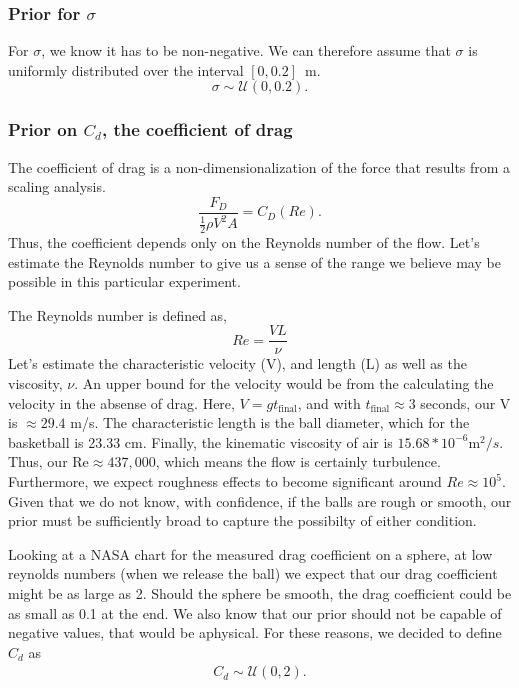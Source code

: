 \documentclass{article}
\begin{document}
\subsubsection*{Prior for $\sigma$}

For $\sigma$, we know it has to be non-negative. We can therefore
assume that $\sigma$ is uniformly distributed over the interval $[0,0.2]$~m.
\[
\sigma\sim\mathcal{U}(0,0.2).
\]



\subsubsection*{Prior on $C_{d}$, the coefficient of drag}

The coefficient of drag is a non-dimensionalization of the force that
results from a scaling analysis.
\[
\frac{F_{D}}{\frac{1}{2}\rho V^{2}A}=C_{D}(Re).
\]
 Thus, the coefficient depends only on the Reynolds number of the
flow. Let's estimate the Reynolds number to give us a sense of the
range we believe may be possible in this particular experiment.

The Reynolds number is defined as,
\[
Re=\frac{VL}{\nu}
\]
 Let's estimate the characteristic velocity (V), and length (L) as
well as the viscosity, $\nu$. An upper bound for the velocity would
be from the calculating the velocity in the absense of drag. Here,
$V=gt_{\text{final}}$, and with $t_{\text{final}}\approx3$ seconds,
our V is $\approx29.4$ m/s. The characteristic length is the ball
diameter, which for the basketball is 23.33 cm. Finally, the kinematic
viscosity of air is $15.68*10^{-6}\text{m}^{2}/s$. Thus, our $\text{Re}\approx437,000$,
which means the flow is certainly turbulence. Furthermore, we expect
roughness effects to become significant around $Re\approx10^{5}$.
Given that we do not know, with confidence, if the balls are rough
or smooth, our prior must be sufficiently broad to capture the possibilty
of either condition.

Looking at a NASA chart for the measured drag coefficient on a sphere,
at low reynolds numbers (when we release the ball) we expect that
our drag coefficient might be as large as 2. Should the sphere be
smooth, the drag coefficient could be as small as 0.1 at the end.
We also know that our prior should not be capable of negative values,
that would be aphysical. For these reasons, we decided to define $C_{d}$
as
\begin{align*}
C_{d}\sim\mathcal{U}(0,2).
\end{align*}
\end{document}
